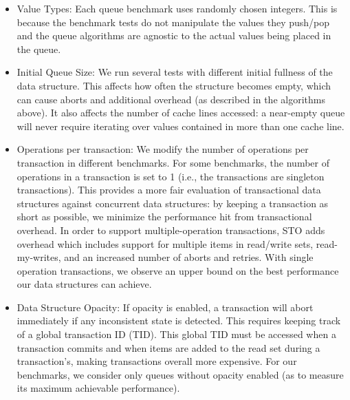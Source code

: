\begin{itemize}
\item Value Types: Each queue benchmark uses randomly chosen integers. This is because the benchmark tests do not manipulate the values they push/pop and the queue algorithms are agnostic to the actual values being placed in the queue.

\item Initial Queue Size: We run several tests with different initial fullness of the data structure. This affects how often the structure becomes empty, which can cause aborts and additional overhead (as described in the algorithms above). It also affects the number of cache lines accessed: a near-empty queue will never require iterating over values contained in more than one cache line.

\item Operations per transaction: We modify the number of operations per transaction in different benchmarks. For some benchmarks, the number of operations in a transaction is set to 1 (i.e., the transactions are singleton transactions). This provides a more fair evaluation of transactional data structures against concurrent data structures: by keeping a transaction as short as possible, we minimize the performance hit from transactional overhead. In order to support multiple-operation transactions, STO adds overhead which includes support for multiple items in read/write sets, read-my-writes, and an increased number of aborts and retries. With single operation transactions, we observe an upper bound on the best performance our data structures can achieve.

\item Data Structure Opacity: If opacity is enabled, a transaction will abort immediately if any inconsistent state is detected. This requires keeping track of a global transaction ID (TID). This global TID must be accessed when a transaction commits and when items are added to the read set during a transaction's, making transactions overall more expensive. For our benchmarks, we consider only queues without opacity enabled (as to measure its maximum achievable performance).
\end{itemize}

